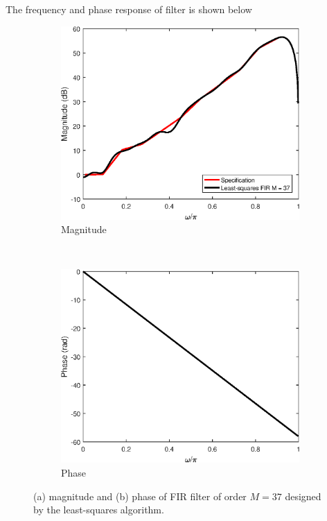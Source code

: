 \documentclass[10pt]{article}
\begin{document}
\begin{enumerate}[label=(\alph*)]
{		The frequency and phase response of filter is shown below
		\FloatBarrier
		\begin{figure}
			\centering
			\begin{subfigure}[h!]{0.5\textwidth}
				\includegraphics[scale=0.55]{figs/hearing_aid_filter_mag.eps}
				\caption{Magnitude}
			\end{subfigure}~\begin{subfigure}[h!]{0.5\textwidth}
				\includegraphics[scale=0.55]{figs/hearing_aid_filter_phase.eps}
				\caption{Phase}
			\end{subfigure}
			\caption{(a) magnitude and (b) phase of FIR filter of order $M = 37$ designed by the least-squares algorithm.}
		\end{figure}
		\FloatBarrier	
	}
	\fi
	

\end{enumerate}
\end{document}
